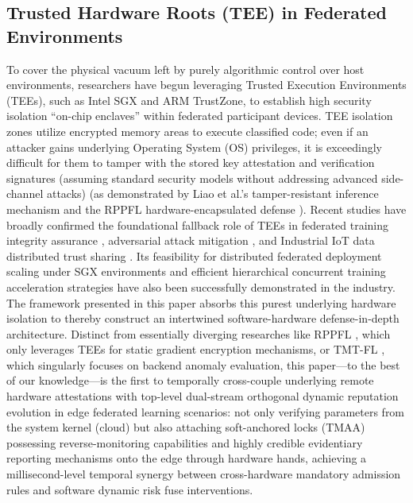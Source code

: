 \documentclass[runningheads]{llncs}
\begin{document}
\subsection{Trusted Hardware Roots (TEE) in Federated Environments}
To cover the physical vacuum left by purely algorithmic control over host environments, researchers have begun leveraging Trusted Execution Environments (TEEs), such as Intel SGX and ARM TrustZone, to establish high security isolation ``on-chip enclaves'' within federated participant devices. TEE isolation zones utilize encrypted memory areas to execute classified code; even if an attacker gains underlying Operating System (OS) privileges, it is exceedingly difficult for them to tamper with the stored key attestation and verification signatures (assuming standard security models without addressing advanced side-channel attacks) (as demonstrated by Liao et al.'s tamper-resistant inference mechanism \cite{liao2024verifiable} and the RPPFL hardware-encapsulated defense \cite{zhang2025rppfl}). Recent studies have broadly confirmed the foundational fallback role of TEEs in federated training integrity assurance \cite{r1_tee_integrity}, adversarial attack mitigation \cite{r5_tee_mitigating}, and Industrial IoT data distributed trust sharing \cite{r12_iot_tee}. Its feasibility for distributed federated deployment scaling under SGX environments \cite{xu2021distributed} and efficient hierarchical concurrent training acceleration strategies \cite{yan2024efficient} have also been successfully demonstrated in the industry.
The framework presented in this paper absorbs this purest underlying hardware isolation to thereby construct an intertwined software-hardware defense-in-depth architecture. Distinct from essentially diverging researches like RPPFL \cite{zhang2025rppfl}, which only leverages TEEs for static gradient encryption mechanisms, or TMT-FL \cite{lu2025tmt}, which singularly focuses on backend anomaly evaluation, this paper---to the best of our knowledge---is the first to temporally cross-couple underlying remote hardware attestations with top-level dual-stream orthogonal dynamic reputation evolution in edge federated learning scenarios: not only verifying parameters from the system kernel (cloud) but also attaching soft-anchored locks (TMAA) possessing reverse-monitoring capabilities and highly credible evidentiary reporting mechanisms onto the edge through hardware hands, achieving a millisecond-level temporal synergy between cross-hardware mandatory admission rules and software dynamic risk fuse interventions.
\end{document}

